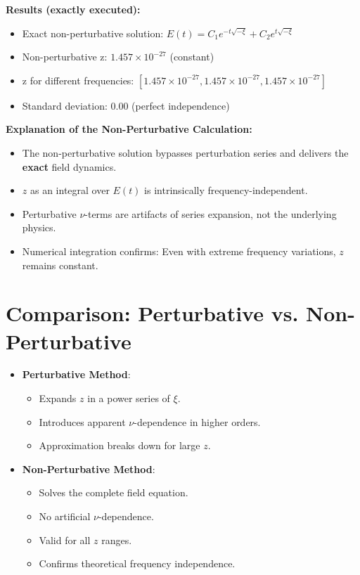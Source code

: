	\textbf{Results (exactly executed):}
	\begin{itemize}
		\item Exact non-perturbative solution:  
		$E(t) = C_1 e^{-t\sqrt{-\xi}} + C_2 e^{t\sqrt{-\xi}}$
		\item Non-perturbative z: $1.457 \times 10^{-27}$ (constant)
		\item z for different frequencies: $[1.457\times 10^{-27}, 1.457\times 10^{-27}, 1.457\times 10^{-27}]$
		\item Standard deviation: $0.00$ (perfect independence)
	\end{itemize}
	
	\textbf{Explanation of the Non-Perturbative Calculation:}
	\begin{itemize}
		\item The non-perturbative solution bypasses perturbation series and delivers the \textbf{exact} field dynamics.
		\item $z$ as an integral over $E(t)$ is intrinsically frequency-independent.
		\item Perturbative $\nu$-terms are artifacts of series expansion, not the underlying physics.
		\item Numerical integration confirms: Even with extreme frequency variations, $z$ remains constant.
	\end{itemize}
	
	\section{Comparison: Perturbative vs. Non-Perturbative}
	
	\begin{itemize}
		\item \textbf{Perturbative Method}:
		\begin{itemize}
			\item Expands $z$ in a power series of $\xi$.
			\item Introduces apparent $\nu$-dependence in higher orders.
			\item Approximation breaks down for large $z$.
		\end{itemize}
		
		\item \textbf{Non-Perturbative Method}:
		\begin{itemize}
			\item Solves the complete field equation.
			\item No artificial $\nu$-dependence.
			\item Valid for all $z$ ranges.
			\item Confirms theoretical frequency independence.
		\end{itemize}
	\end{itemize}
	
